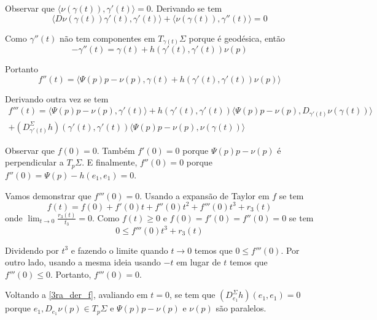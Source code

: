 \begin{demonstracao}
	Observar que $ \langle \nu(\gamma(t)), \gamma'(t) \rangle = 0 $. Derivando se tem
	\begin{equation*}
		\langle D \nu(\gamma(t)) \gamma'(t), \gamma'(t) \rangle + \langle \nu(\gamma(t)), \gamma''(t) \rangle = 0
	\end{equation*}
	
	Como $\gamma''(t)$ não tem componentes em $T_{\gamma(t)} \Sigma$ porque é geodésica, então
	\begin{equation*}
		-\gamma''(t) = \gamma(t) + h(\gamma'(t), \gamma'(t)) \nu(p)
	\end{equation*}
	
	Portanto
	\begin{equation*}
		f''(t) = \langle \Psi(p) p - \nu(p), \gamma(t) + h(\gamma'(t), \gamma'(t)) \nu(p) \rangle
	\end{equation*}
	
	Derivando outra vez se tem
	\begin{multline}\label{3ra_der_f}
		f'''(t) = \langle \Psi(p)p - \nu(p), \gamma'(t) \rangle + h(\gamma'(t), \gamma'(t)) \langle \Psi(p)p - \nu(p), D_{\gamma'(t)} \nu(\gamma(t)) \rangle\\
		+ \left( D_{\gamma'(t)}^{\Sigma} h \right) (\gamma'(t), \gamma'(t)) \langle \Psi(p)p - \nu(p), \nu(\gamma(t)) \rangle
	\end{multline}
	
	Observar que $f(0)=0$. Também $f'(0)=0$ porque $\Psi(p)p - \nu(p)$ é perpendicular a $T_p \Sigma$. E finalmente, $f''(0)=0$ porque $f''(0) = \Psi(p) - h(e_1,e_1)=0$.
	
	Vamos demonstrar que $f'''(0)=0$. Usando a expansão de Taylor em $f$ se tem
	\begin{equation*}
		f(t) = f(0) + f'(0)t + f''(0)t^2 + f'''(0)t^3 + r_3(t)
	\end{equation*}  
	onde $\lim_{t \rightarrow 0} \frac{r_3(t)}{t_3}=0$. Como $f(t) \geq 0$ e $f(0)=f'(0)=f''(0)=0$ se tem
	\begin{equation*}
		0 \leq f'''(0) t^3 + r_3(t)
	\end{equation*}
	
	Dividendo por $t^3$ e fazendo o limite quando $t \rightarrow 0$ temos que $0 \leq f'''(0)$. Por outro lado, usando a mesma ideia usando $-t$ em lugar de  $t$ temos que $f'''(0) \leq 0$. Portanto, $f'''(0)=0$.
	
	Voltando  a \ref{3ra_der_f}, avaliando em $t=0$, se tem que $(D_{e_1}^{\Sigma} h) (e_1,e_1) = 0$ porque $e_1, D_{e_1} \nu(p) \in T_p \Sigma$ e $\Psi(p)p - \nu(p)$ e $\nu(p)$ são paralelos.
	

\end{demonstracao}
